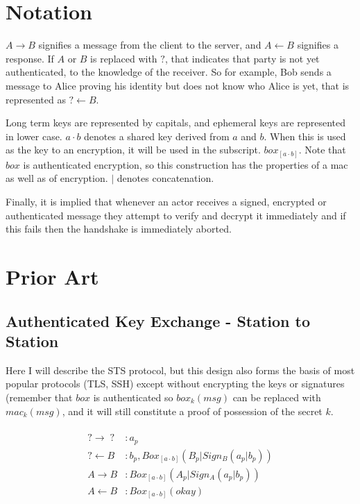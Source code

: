\documentclass[12pt]{article}
\begin{document}
\section{Notation}

$A \to B$ signifies a message from the client to the server, and
$A \gets B$ signifies a response. If $A$ or $B$ is replaced with $?$,
that indicates that party is not yet authenticated, to the knowledge
of the receiver. So for example, Bob sends a message to Alice proving
his identity but does not know who Alice is yet, that is represented
as $? \gets B$.

Long term keys are represented by capitals, and ephemeral keys are
represented in lower case. $a \cdot b$ denotes a shared key derived
from $a$ and $b$. When this is used as the key to an encryption,
it will be used in the subscript. $box_{[a\cdot b]}$. Note that
$box$ is authenticated encryption, so this construction has the
properties of a mac as well as of encryption. $|$ denotes concatenation.

Finally, it is implied that whenever an actor receives a signed,
encrypted or authenticated message they attempt to verify and
decrypt it immediately and if this fails then the handshake is immediately
aborted.

\section{Prior Art}

\subsection{Authenticated Key Exchange - Station to Station}

Here I will describe the STS protocol\cite{aake}, but this design also
forms the basis of most popular protocols (TLS, SSH) except
without encrypting the keys or signatures (remember that $box$
is authenticated so $box_k(msg)$ can be replaced with $mac_k(msg)$,
and it will still constitute a proof of possession of the secret $k$.

$$
\begin{align*}
\\
    ? \to \;?\;   &: a_p \\
    ? \gets B &: b_p, Box_{[a\cdot b]}(B_p | Sign_B(a_p|b_p)) \\
    A \to B   &: Box_{[a\cdot b]}(A_p | Sign_A(a_p | b_p)) \\
    A \gets B &: Box_{[a\cdot b]}(okay) \\
\\
\end{align*}
$$
\end{document}
